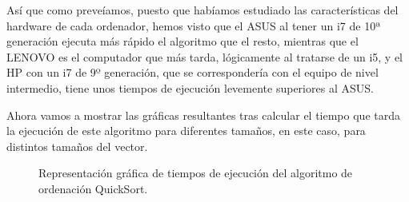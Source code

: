 \documentclass{homework}
\begin{document}
    Así que como preveíamos, puesto que habíamos estudiado las características del hardware de cada ordenador, hemos visto que el ASUS al 
    tener un i7 de 10ª generación ejecuta más rápido el algoritmo que el resto, mientras que el LENOVO es el computador que más tarda, 
    lógicamente al tratarse de un i5, y el HP con un i7 de 9º generación, que se correspondería con el equipo de nivel intermedio, tiene unos tiempos
    de ejecución levemente superiores al ASUS.  
    
    Ahora vamos a mostrar las gráficas resultantes tras calcular el tiempo que tarda la ejecución de este algoritmo para diferentes
    tamaños, en este caso, para distintos tamaños del vector.

    \begin{figure}[H]
        \centering


        \caption{Representación gráfica de tiempos de ejecución del algoritmo de ordenación QuickSort.}

        \label{emp:quicksort}
    \end{figure}
\end{document}
